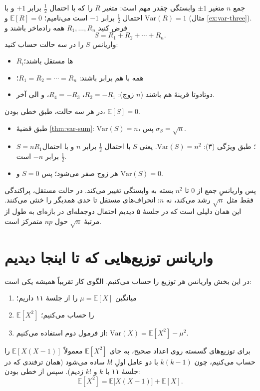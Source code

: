 \begin{example}[label=ex:rademacher]{جمع $n$ متغیر $\pm1$ وابستگی چقدر مهم است:}
  متغیر $R$ را که با احتمال $\tfrac12$ برابر $+1$ و با احتمال $\tfrac12$ برابر $-1$ است  می‌نامیم؛ $\mathbb E[R]=0$ و $\mathrm{Var}(R)=1$ (مثال \ref{ex:var-three}). فرض کنید $R_1,\dots,R_n$ همه رادماخر باشند و
  \[ S=R_1+R_2+\cdots+R_n. \]
  واریانس $S$ را در سه حالت حساب کنید:
  \begin{itemize}
    \item[(الف)] $R_i$ها مستقل باشند؛
    \item[(ب)] همه با هم برابر باشند: $R_1=R_2=\cdots=R_n$؛
    \item[(ج)] دوتادوتا قرینهٔ هم باشند ($n$ زوج): $R_2=-R_1$، $R_4=-R_3$، و الی آخر.
  \end{itemize}
  \begin{solution}
    در هر سه حالت، طبق خطی بودن، $\mathbb E[S]=0$.
    \begin{itemize}
      \item[(الف)] طبق قضیهٔ \ref{thm:var-sum}: $\mathrm{Var}(S)=n$، پس $\sigma_S=\sqrt n$.
      \item[(ب)] $S=nR_1$؛ طبق ویژگی (۳): $\mathrm{Var}(S)=n^2$. یعنی $S$ با احتمال $\tfrac12$ برابر $n$ و با احتمال $\tfrac12$ برابر $-n$ است.
      \item[(ج)] هر زوج صفر می‌شود؛ پس $S=0$ و $\mathrm{Var}(S)=0$.
    \end{itemize}
    پس واریانسِ جمع از $0$ تا $n^2$ بسته به وابستگی تغییر می‌کند. در حالت مستقل، پراکندگی فقط مثل $\sqrt n$ رشد می‌کند، نه $n$: انحراف‌های مستقل تا حدی همدیگر را خنثی می‌کنند. این همان دلیلی است که در جلسهٔ ۵ دیدیم احتمال دوجمله‌ای در بازه‌ای به طول از مرتبهٔ $\sqrt n$ حول $np$ متمرکز است.
  \end{solution}
\end{example}

\section{واریانس توزیع‌هایی که تا اینجا دیدیم}
\label{sec:var-dists}

در این بخش واریانس هر توزیع را حساب می‌کنیم. الگوی کار تقریباً همیشه یکی است:
\begin{enumerate}
  \item میانگین $\mu=\mathbb E[X]$ را از جلسهٔ ۱۱ داریم؛
  \item $\mathbb E[X^2]$ را حساب می‌کنیم؛
  \item از فرمول دوم استفاده می‌کنیم: $\mathrm{Var}(X)=\mathbb E[X^2]-\mu^2$.
\end{enumerate}
برای توزیع‌های گسسته روی اعداد صحیح، به جای $\mathbb E[X^2]$ معمولاً $\mathbb E[X(X-1)]$ را حساب می‌کنیم، چون $k(k-1)$ با دو عامل اولِ $k!$ ساده می‌شود (همان ترفندی که در جلسهٔ ۱۱ با $k$ و $k!$ زدیم). سپس از خطی بودن:
\[ \mathbb E[X^2]=\mathbb E\bigl[X(X-1)\bigr]+\mathbb E[X]. \]

